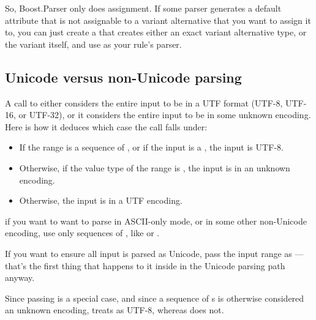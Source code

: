 \documentclass{MyBook}
\begin{document}
So, Boost.Parser only does assignment. If some parser  generates a default attribute that is not assignable to a variant alternative that you want to assign it to, you can just create a  that creates either an exact variant alternative type, or the variant itself, and use  as your rule's parser.

\subsection{Unicode versus non-Unicode parsing}

A call to  either considers the entire input to be in a UTF format (UTF-8, UTF-16, or UTF-32), or it considers the entire input to be in some unknown encoding. Here is how it deduces which case the call falls under:

\begin{itemize}
\item
  If the range is a sequence of , or if the input is a , the input is UTF-8.
\item
  Otherwise, if the value type of the range is , the input is in an unknown encoding.
\item
  Otherwise, the input is in a UTF encoding.
\end{itemize}

\begin{marker}[title=Tip ]
if you want to want to parse in ASCII-only mode, or in some other non-Unicode encoding, use only sequences of , like  or . 
\end{marker}

\begin{marker}[title=Tip ]
If you want to ensure all input is parsed as Unicode, pass the input range  as  --- that's the first thing that happens to it inside  in the Unicode parsing path anyway. 
\end{marker}

\begin{marker}[title=Note ]
Since passing  is a special case, and since a sequence of s  is otherwise considered an unknown encoding,  treats  as UTF-8, whereas  does not. 
\end{marker}
\end{document}
